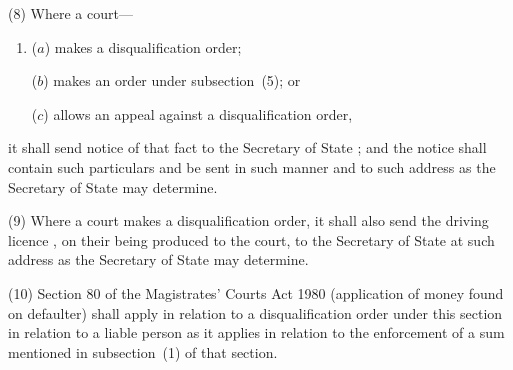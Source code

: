\documentclass[12pt,a4paper]{article}
\begin{document}
(8) Where a court—
\begin{enumerate}\item[]
($a$) makes a disqualification order;

($b$) makes an order under subsection~(5); or

($c$) allows an appeal against a disqualification order,
\end{enumerate}
it shall send notice of that fact to the 
Secretary of State%
; and the notice shall contain such particulars and be sent in such manner and to such address as the 
Secretary of State  %
may determine.

(9) Where a court makes a disqualification order, it shall also send the driving licence%
, on 
their 
being produced to the court, to the 
Secretary of State  %
at such address as 
the Secretary of State  %
may determine.

(10) Section 80 of the Magistrates' Courts Act 1980 (application of money found on defaulter) shall apply in relation to a disqualification order under this section in relation to a liable person as it applies in relation to the enforcement of a sum mentioned in subsection~(1)  of that section.

%
%
%
\end{document}
